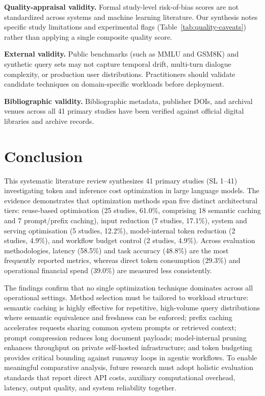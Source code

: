 \IfFileExists{jair.cls}{\documentclass{jair}}{\documentclass[manuscript,nonacm,screen]{acmart}}
\begin{document}
\textbf{Quality-appraisal validity.} Formal study-level risk-of-bias scores are not standardized across systems and machine learning literature. Our synthesis notes specific study limitations and experimental flags (Table~\ref{tab:quality-caveats}) rather than applying a single composite quality score.

\textbf{External validity.} Public benchmarks (such as MMLU and GSM8K) and synthetic query sets may not capture temporal drift, multi-turn dialogue complexity, or production user distributions. Practitioners should validate candidate techniques on domain-specific workloads before deployment.

\textbf{Bibliographic validity.} Bibliographic metadata, publisher DOIs, and archival venues across all 41 primary studies have been verified against official digital libraries and archive records.

\section{Conclusion}

This systematic literature review synthesizes 41 primary studies (SL 1--41) investigating token and inference cost optimization in large language models. The evidence demonstrates that optimization methods span five distinct architectural tiers: reuse-based optimisation (25 studies, 61.0\%, comprising 18 semantic caching and 7 prompt/prefix caching), input reduction (7 studies, 17.1\%), system and serving optimisation (5 studies, 12.2\%), model-internal token reduction (2 studies, 4.9\%), and workflow budget control (2 studies, 4.9\%). Across evaluation methodologies, latency (58.5\%) and task accuracy (48.8\%) are the most frequently reported metrics, whereas direct token consumption (29.3\%) and operational financial spend (39.0\%) are measured less consistently.

The findings confirm that no single optimization technique dominates across all operational settings. Method selection must be tailored to workload structure: semantic caching is highly effective for repetitive, high-volume query distributions where semantic equivalence and freshness can be enforced; prefix caching accelerates requests sharing common system prompts or retrieved context; prompt compression reduces long document payloads; model-internal pruning enhances throughput on private self-hosted infrastructure; and token budgeting provides critical bounding against runaway loops in agentic workflows. To enable meaningful comparative analysis, future research must adopt holistic evaluation standards that report direct API costs, auxiliary computational overhead, latency, output quality, and system reliability together.
\end{document}
